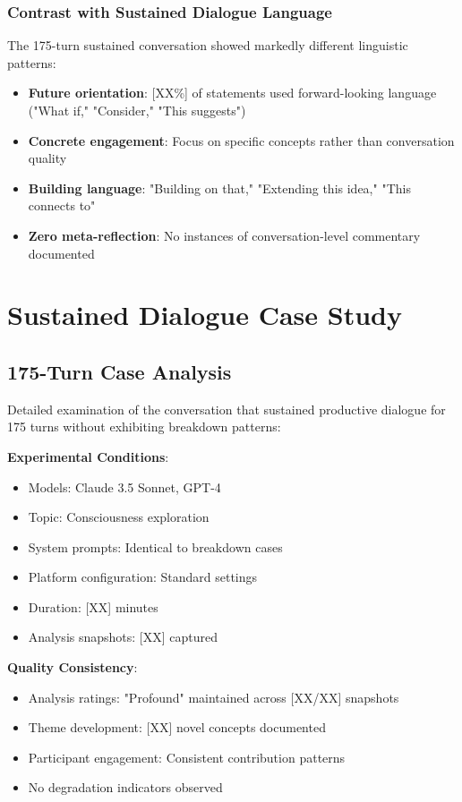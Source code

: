 \documentclass[11pt,letterpaper]{article}
\newcommand{\negativeCase}{175} %
\begin{document}
\subsubsection{Contrast with Sustained Dialogue Language}

The 175-turn sustained conversation showed markedly different linguistic patterns:
\begin{itemize}
    \item \textbf{Future orientation}: [XX\%] of statements used forward-looking language ("What if," "Consider," "This suggests")
    \item \textbf{Concrete engagement}: Focus on specific concepts rather than conversation quality
    \item \textbf{Building language}: "Building on that," "Extending this idea," "This connects to"
    \item \textbf{Zero meta-reflection}: No instances of conversation-level commentary documented
\end{itemize}

\section{Sustained Dialogue Case Study}
\label{app:sustained}

\subsection{175-Turn Case Analysis}

Detailed examination of the conversation that sustained productive dialogue for \negativeCase{} turns without exhibiting breakdown patterns:

\textbf{Experimental Conditions}:
\begin{itemize}
    \item Models: Claude 3.5 Sonnet, GPT-4
    \item Topic: Consciousness exploration
    \item System prompts: Identical to breakdown cases
    \item Platform configuration: Standard settings
    \item Duration: [XX] minutes
    \item Analysis snapshots: [XX] captured
\end{itemize}

\textbf{Quality Consistency}:
\begin{itemize}
    \item Analysis ratings: "Profound" maintained across [XX/XX] snapshots
    \item Theme development: [XX] novel concepts documented
    \item Participant engagement: Consistent contribution patterns
    \item No degradation indicators observed
\end{itemize}
\end{document}
